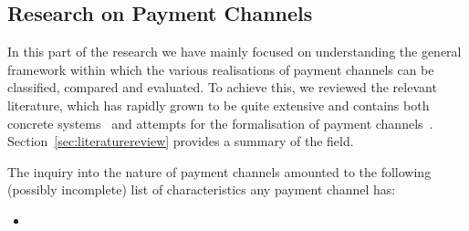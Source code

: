 \subsection{Research on Payment Channels}
  In this part of the research we have mainly focused on understanding the general
  framework within which the various realisations of payment channels can be classified,
  compared and evaluated. To achieve this, we reviewed the relevant literature, which has
  rapidly grown to be quite extensive and contains both concrete
  systems~\cite{abunchofthings} and attempts for the formalisation of payment
  channels~\cite{statechannels}. Section~\ref{sec:literaturereview} provides a summary of
  the field.

  The inquiry into the nature of payment channels amounted to the following (possibly
  incomplete) list of characteristics any payment channel has:
  \begin{itemize}
    \item
  \end{itemize}
